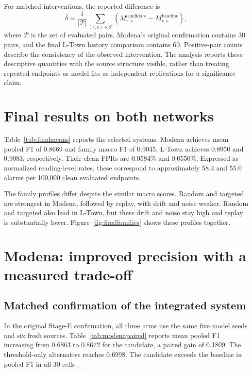 For matched interventions, the reported difference is
\begin{equation}
 \overline\delta=\frac{1}{|\mathcal P|}\sum_{(r,s)\in\mathcal P}
 \left(M^{\mathrm{candidate}}_{r,s}-M^{\mathrm{baseline}}_{r,s}\right),
 \label{eq:paireddifference}
\end{equation}
where $\mathcal P$ is the set of evaluated pairs. Modena's original confirmation contains 30 pairs, and the final L-Town history comparison contains 60. Positive-pair counts describe the consistency of the observed intervention. The analysis reports these descriptive quantities with the source structure visible, rather than treating repeated endpoints or model fits as independent replications for a significance claim.

\section{Final results on both networks}

Table~\ref{tab:finalmeans} reports the selected systems. Modena achieves mean pooled F1 of 0.8669 and family macro F1 of 0.9045. L-Town achieves 0.8950 and 0.9083, respectively. Their clean FPRs are 0.0584\% and 0.0550\%. Expressed as normalized reading-level rates, these correspond to approximately 58.4 and 55.0 alarms per 100,000 clean evaluated endpoints.

The family profiles differ despite the similar macro scores. Random and targeted are strongest in Modena, followed by replay, with drift and noise weaker. Random and targeted also lead in L-Town, but there drift and noise stay high and replay is substantially lower. Figure~\ref{fig:finalfamilies} shows these profiles together.


\FloatBarrier
\section{Modena: improved precision with a measured trade-off}
\subsection{Matched confirmation of the integrated system}
In the original Stage-E confirmation, all three arms use the same five model seeds and six fresh sources. Table~\ref{tab:modenapaired} reports mean pooled F1 increasing from 0.6863 to 0.8672 for the candidate, a paired gain of 0.1809. The threshold-only alternative reaches 0.6998. The candidate exceeds the baseline in pooled F1 in all 30 cells \cite{projectcampaign}.

